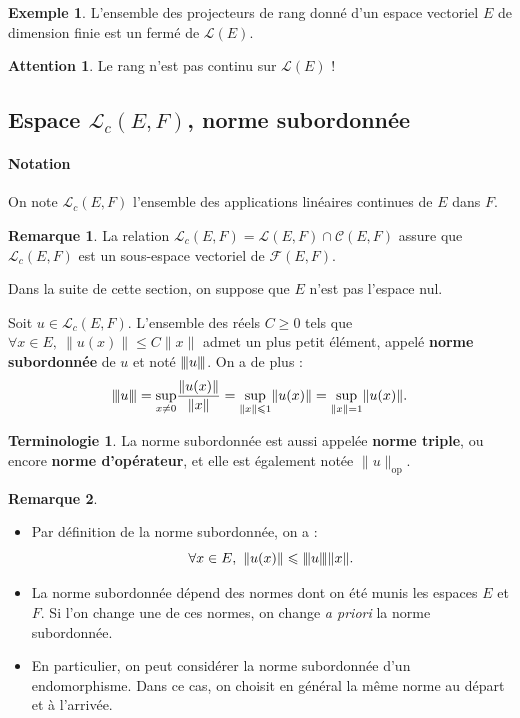 \documentclass[french]{article}
\newcommand{\vertiii}[1]{{\left\vert\kern-0.25ex\left\vert\kern-0.25ex\left\vert #1 \right\vert\kern-0.25ex\right\vert\kern-0.25ex\right\vert}}
\theoremstyle{plain}
\theoremstyle{definition}
\newtheorem*{ex}{Exemple}
\newtheorem*{rmq}{Remarque}
\newtheorem*{terminologie}{Terminologie}
\newtheorem*{attention}{Attention}
\theoremstyle{remark}
\begin{document}
\begin{ex}
	L'ensemble des projecteurs de rang donné d'un espace vectoriel $E$ de dimension finie est un fermé de $\mathcal{L}(E)$.
\end{ex}

\begin{attention}
	Le rang n'est pas continu sur $\mathcal{L}(E)$ !
\end{attention}

\subsection{Espace $\mathcal{L}_c(E,F)$, norme subordonnée}

\paragraph{Notation} On note $\mathcal{L}_c(E,F)$ l'ensemble des applications linéaires continues de $E$ dans $F$.

\begin{rmq}
	La relation $\mathcal{L}_c(E,F)=\mathcal{L}(E,F)\cap\mathcal{C}(E,F)$ assure que $\mathcal{L}_c(E,F)$ est un sous-espace vectoriel de $\mathcal{F}(E,F)$.
\end{rmq}

Dans la suite de cette section, on suppose que $E$ n'est pas l'espace nul.

\begin{prop}%
	Soit $u\in\mathcal{L}_c(E,F)$. L'ensemble des réels $C\geqslant 0$ tels que $\forall x\in E,\ \lVert u(x)\rVert\leqslant C\lVert x\rVert$ admet un plus petit élément, appelé \textbf{norme subordonnée} de $u$ et noté $\vertiii{u}$. On a de plus : $$\vertiii{u}=\underset{x\ne 0}{\sup}\frac{\lVert u(x)\rVert}{\lVert x\rVert}=\underset{\lVert x\rVert\leqslant1}{\sup}\lVert u(x)\rVert=\underset{\lVert x\rVert=1}{\sup}\lVert u(x)\rVert.$$
\end{prop}

\begin{terminologie}
	La norme subordonnée est aussi appelée \textbf{norme triple}, ou encore \textbf{norme d'opérateur}, et elle est également notée $\lVert u\rVert_{\text{op}}$.
\end{terminologie}

\begin{rmq}
	\begin{itemize}
		\item Par définition de la norme subordonnée, on a : $$\forall x\in E,\ \lVert u(x)\rVert\leqslant\vertiii{u}\lVert x\rVert.$$
		\item La norme subordonnée dépend des normes dont on été munis les espaces $E$ et $F$. Si l'on change une de ces normes, on change \textit{a priori} la norme subordonnée.
		\item En particulier, on peut considérer la norme subordonnée d'un endomorphisme. Dans ce cas, on choisit en général la même norme au départ et à l'arrivée.
	\end{itemize}
\end{rmq}
\end{document}
